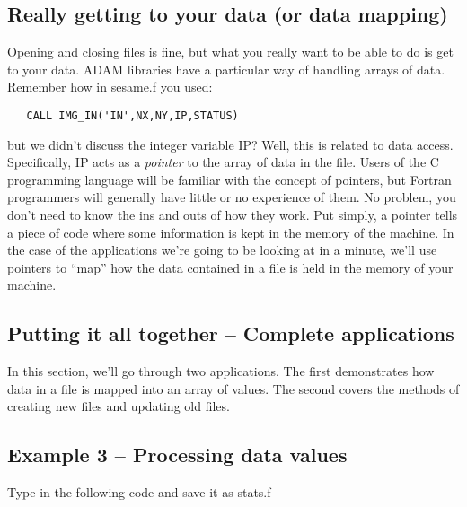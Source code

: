 \subsection{Really getting to your data (or data mapping)}

Opening and closing files is fine, but what you really want to be able to
do is get to your data. ADAM libraries have a particular way of handling
arrays of data. Remember how in {\sf sesame.f} you used:

\begin{verbatim}
   CALL IMG_IN('IN',NX,NY,IP,STATUS)
\end{verbatim}

but we didn't discuss the integer variable {\sf IP}? Well, this is
related to data access. Specifically, {\sf IP} acts as a {\it
pointer} to the array of data in the file. Users of the C programming
language will be familiar with the concept of pointers, but Fortran
programmers will generally have little or no experience of them. No problem,
you don't need to know the ins and outs of how they work. Put simply, a
pointer tells a piece of code where some information is kept in the memory
of the machine. In the case of the applications we're going to be looking
at in a minute, we'll use pointers to ``map'' how the data contained in a
file is held in the memory of your machine. 

\subsection{Putting it all together -- Complete applications}

In this section, we'll go through two applications. The first demonstrates
how data in a file is mapped into an array of values. The second covers
the methods of creating new files and updating old files.

\subsection{Example 3 -- Processing data values}

Type in the following code and save it as {\sf stats.f}

